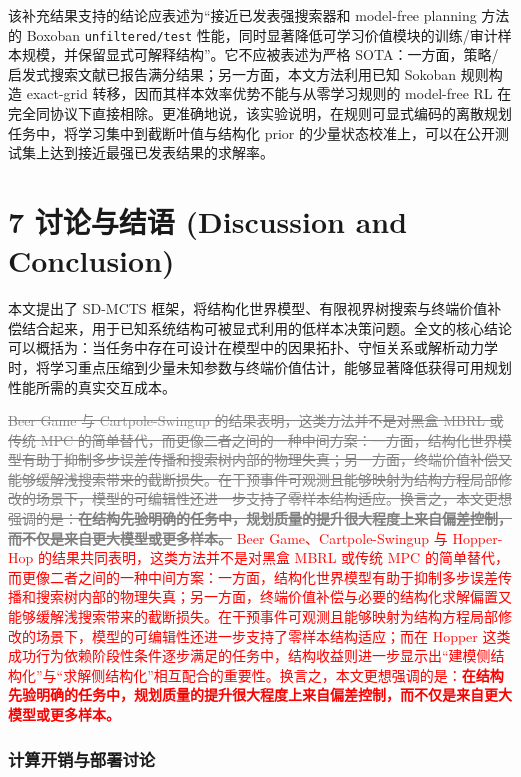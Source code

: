 \documentclass[UTF8]{ctexart}
\newcommand{\revadd}[1]{\textcolor{red}{#1}}
\newcommand{\revdel}[1]{\textcolor{gray}{\sout{#1}}}
\begin{document}
该补充结果支持的结论应表述为“接近已发表强搜索器和 model-free planning 方法的 Boxoban \texttt{unfiltered/test} 性能，同时显著降低可学习价值模块的训练/审计样本规模，并保留显式可解释结构”。它不应被表述为严格 SOTA：一方面，策略/启发式搜索文献已报告满分结果；另一方面，本文方法利用已知 Sokoban 规则构造 exact-grid 转移，因而其样本效率优势不能与从零学习规则的 model-free RL 在完全同协议下直接相除。更准确地说，该实验说明，在规则可显式编码的离散规划任务中，将学习集中到截断叶值与结构化 prior 的少量状态校准上，可以在公开测试集上达到接近最强已发表结果的求解率。

\hypertarget{ux8ba8ux8bbaux4e0eux7ed3ux8bed-discussion-and-conclusion}{%
\section{7 讨论与结语 (Discussion and
Conclusion)}\label{ux8ba8ux8bbaux4e0eux7ed3ux8bed-discussion-and-conclusion}}

本文提出了 SD-MCTS 框架，将结构化世界模型、有限视界树搜索与终端价值补偿结合起来，用于已知系统结构可被显式利用的低样本决策问题。全文的核心结论可以概括为：当任务中存在可设计在模型中的因果拓扑、守恒关系或解析动力学时，将学习重点压缩到少量未知参数与终端价值估计，能够显著降低获得可用规划性能所需的真实交互成本。

\revdel{Beer Game 与 Cartpole-Swingup 的结果表明，这类方法并不是对黑盒 MBRL 或传统 MPC 的简单替代，而更像二者之间的一种中间方案：一方面，结构化世界模型有助于抑制多步误差传播和搜索树内部的物理失真；另一方面，终端价值补偿又能够缓解浅搜索带来的截断损失。在干预事件可观测且能够映射为结构方程局部修改的场景下，模型的可编辑性还进一步支持了零样本结构适应。换言之，本文更想强调的是：\textbf{在结构先验明确的任务中，规划质量的提升很大程度上来自偏差控制，而不仅是来自更大模型或更多样本。}}
\revadd{Beer Game、Cartpole-Swingup 与 Hopper-Hop 的结果共同表明，这类方法并不是对黑盒 MBRL 或传统 MPC 的简单替代，而更像二者之间的一种中间方案：一方面，结构化世界模型有助于抑制多步误差传播和搜索树内部的物理失真；另一方面，终端价值补偿与必要的结构化求解偏置又能够缓解浅搜索带来的截断损失。在干预事件可观测且能够映射为结构方程局部修改的场景下，模型的可编辑性还进一步支持了零样本结构适应；而在 Hopper 这类成功行为依赖阶段性条件逐步满足的任务中，结构收益则进一步显示出“建模侧结构化”与“求解侧结构化”相互配合的重要性。换言之，本文更想强调的是：\textbf{在结构先验明确的任务中，规划质量的提升很大程度上来自偏差控制，而不仅是来自更大模型或更多样本。}}

\hypertarget{ux73b0ux5b9eux90e8ux7f72ux542bux4e49-online-overhead}{%
\subsubsection{计算开销与部署讨论}\label{ux73b0ux5b9eux90e8ux7f72ux542bux4e49-online-overhead}}
\end{document}
